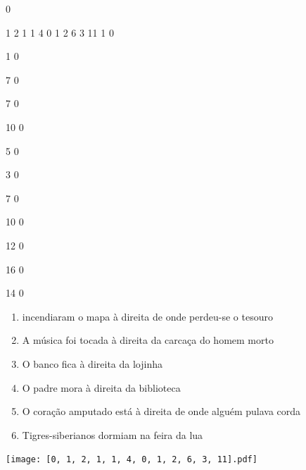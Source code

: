 \documentclass[12pt]{article}
\begin{document}
		\vfill  
		  
{
	0	%

	1	%
	2	%
	1	%
	1	%
	4	%
	0	%
	1	%
	2	%
	6	%
	3	%
	11	%
	1	%
	0	%

	1	%
	0	%

	7	%
	0	%

	7	%
	0	%

	10	%
	0	%

	5	%
	0	%

	3	%
	0	%

	7	%
	0	%

	10	%
	0	%

	12	%
	0	%

	16	%
	0	%

	14	%
	0	%

}	  
		    	

		 

\pagebreak


	\begin{enumerate}
		  \sffamily %
		  \large %


\vfill \item
incendiaram o mapa	%
à direita
de onde perdeu-se o tesouro	%

\vfill \item
A música foi tocada	%
à direita
da carcaça do homem morto	%

\vfill \item
O banco fica	%
à direita
da lojinha	%

\vfill \item
O padre mora	%
à direita
da biblioteca	%

\vfill \item
O coração amputado está	%
à direita
de onde alguém pulava corda	%

\vfill \item
Tigres-siberianos dormiam	%
na feira da lua	%
	\end{enumerate}
		  
		  \hfill

		  \vfill

\texttt{[image: [0, 1, 2, 1, 1, 4, 0, 1, 2, 6, 3, 11].pdf]}
\end{document}
